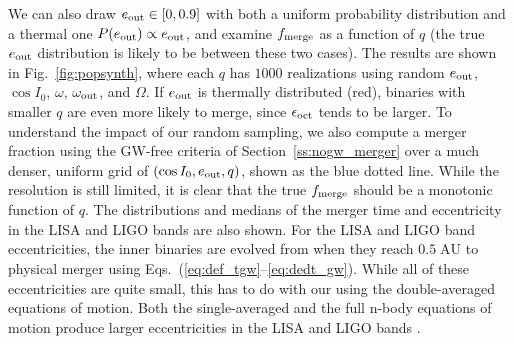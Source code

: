\documentclass[
        fleqn,
        usenatbib,
    ]{mnras}
\begin{document}
We can also draw $e_{\rm out} \in [0, 0.9]$ with both a uniform probability
distribution and a thermal one $P(e_{\rm out}) \propto e_{\rm out}$, and examine
$f_{\rm merge}$ as a function of $q$ (the true $e_{\rm out}$ distribution is
likely to be between these two cases). The results are shown in
Fig.~\ref{fig:popsynth}, where each $q$ has $1000$ realizations using random
$e_{\rm out}$, $\cos I_0$, $\omega$, $\omega_{\rm out}$, and $\Omega$. If
$e_{\rm out}$ is thermally distributed (red), binaries with smaller $q$ are even
more likely to merge, since $\epsilon_{\rm oct}$ tends to be larger. To
understand the impact of our random sampling, we also compute a merger fraction
using the GW-free criteria of Section~\ref{ss:nogw_merger} over a much denser,
uniform grid of $(\cos I_0, e_{\rm out}, q)$, shown as the blue dotted line.
While the resolution is still limited, it is clear that the true $f_{\rm
merge}$ should be a monotonic function of $q$. The distributions and medians of
the merger time and eccentricity in the LISA and LIGO bands are also shown. For
the LISA and LIGO band eccentricities, the inner binaries are evolved from when
they reach $0.5\;\mathrm{AU}$ to physical merger using
Eqs.~(\ref{eq:def_tgw}--\ref{eq:dedt_gw}). While all of these eccentricities are
quite small, this has to do with our using the double-averaged equations of
motion. Both the single-averaged and the full n-body equations of motion produce
larger eccentricities in the LISA and LIGO bands \citep{LL19}.
\end{document}
